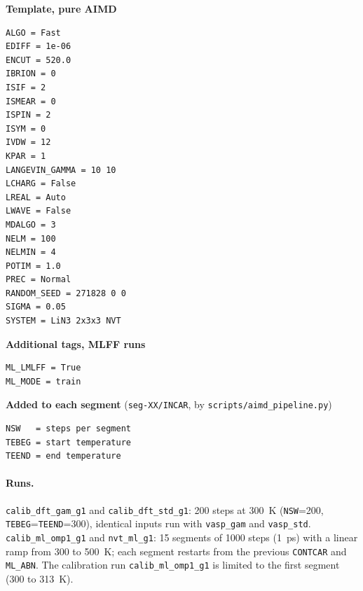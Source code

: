 \documentclass[11pt,letterpaper]{article}
\begin{document}
\noindent
\begin{minipage}[t]{0.48\linewidth}
\textbf{Template, pure AIMD}
\small
\begin{verbatim}
ALGO = Fast
EDIFF = 1e-06
ENCUT = 520.0
IBRION = 0
ISIF = 2
ISMEAR = 0
ISPIN = 2
ISYM = 0
IVDW = 12
KPAR = 1
LANGEVIN_GAMMA = 10 10
LCHARG = False
LREAL = Auto
LWAVE = False
MDALGO = 3
NELM = 100
NELMIN = 4
POTIM = 1.0
PREC = Normal
RANDOM_SEED = 271828 0 0
SIGMA = 0.05
SYSTEM = LiN3 2x3x3 NVT
\end{verbatim}
\end{minipage}\hfill
\begin{minipage}[t]{0.48\linewidth}
\textbf{Additional tags, MLFF runs}
\small
\begin{verbatim}
ML_LMLFF = True
ML_MODE = train
\end{verbatim}
\vspace{1ex}
\textbf{Added to each segment} (\texttt{seg-XX/INCAR}, by \texttt{scripts/aimd\_pipeline.py})
\small
\begin{verbatim}
NSW   = steps per segment
TEBEG = start temperature
TEEND = end temperature
\end{verbatim}
\end{minipage}

\paragraph{Runs.} \texttt{calib\_dft\_gam\_g1} and \texttt{calib\_dft\_std\_g1}: 200 steps at
\SI{300}{K} (\texttt{NSW}=200, \texttt{TEBEG}=\texttt{TEEND}=300), identical inputs run with
\texttt{vasp\_gam} and \texttt{vasp\_std}. \texttt{calib\_ml\_omp1\_g1} and \texttt{nvt\_ml\_g1}:
15 segments of 1000 steps (\SI{1}{ps}) with a linear ramp from 300 to \SI{500}{K}; each segment
restarts from the previous \texttt{CONTCAR} and \texttt{ML\_ABN}. The calibration run
\texttt{calib\_ml\_omp1\_g1} is limited to the first segment (300 to \SI{313}{K}).



\end{document}
